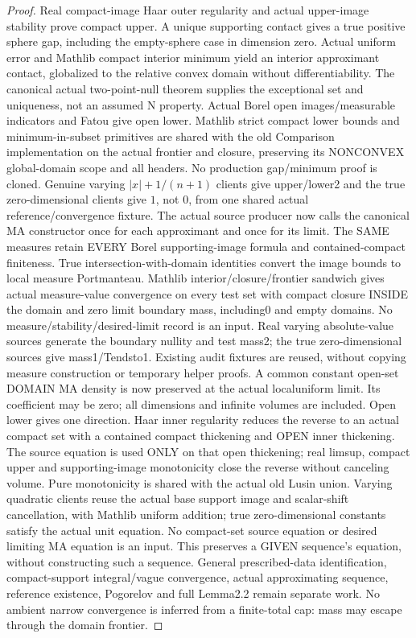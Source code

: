 \begin{proof}
  \leanok
  Real compact-image Haar outer regularity and actual upper-image stability
  prove compact upper. A unique supporting contact gives a true positive
  sphere gap, including the empty-sphere case in dimension zero. Actual
  uniform error and Mathlib compact interior minimum yield an interior
  approximant contact, globalized to the relative convex domain without
  differentiability. The canonical actual two-point-null theorem supplies
  the exceptional set and uniqueness, not an assumed N property. Actual
  Borel open images/measurable indicators and Fatou give open lower.
  Mathlib strict compact lower bounds and minimum-in-subset primitives are
  shared with the old Comparison implementation on the actual frontier
  and closure, preserving its NONCONVEX global-domain scope and all headers.
  No production gap/minimum proof is cloned. Genuine varying $|x|+1/(n+1)$
  clients give upper/lower2 and the true zero-dimensional clients give $1$,
  not $0$, from one shared actual reference/convergence fixture. The actual source producer now calls the canonical MA constructor once
  for each approximant and once for its limit. The SAME measures retain
  EVERY Borel supporting-image formula and contained-compact finiteness.
  True intersection-with-domain identities convert the image bounds to
  local measure Portmanteau. Mathlib interior/closure/frontier sandwich
  gives actual measure-value convergence on every test set with compact
  closure INSIDE the domain and zero limit boundary mass, including0 and
  empty domains. No measure/stability/desired-limit record is an input.
  Real varying absolute-value sources generate the boundary nullity and
  test mass2; the true zero-dimensional sources give mass1/Tendsto1.
  Existing audit fixtures are reused, without copying measure construction
  or temporary helper proofs. A common constant open-set DOMAIN MA
  density is now preserved at the actual localuniform limit. Its coefficient
  may be zero; all dimensions and infinite volumes are included. Open lower
  gives one direction. Haar inner regularity reduces the reverse to an
  actual compact set with a contained compact thickening and OPEN inner
  thickening. The source equation is used ONLY on that open thickening;
  real limsup, compact upper and supporting-image monotonicity close the
  reverse without canceling volume. Pure monotonicity is shared with the
  actual old Lusin union. Varying quadratic clients reuse the actual base
  support image and scalar-shift cancellation, with Mathlib uniform
  addition; true zero-dimensional constants satisfy the actual unit equation.
  No compact-set source equation or desired limiting MA equation is an input.
  This preserves a GIVEN sequence's equation, without constructing such a
  sequence. General prescribed-data identification, compact-support
  integral/vague convergence, actual approximating sequence, reference
  existence, Pogorelov and full Lemma2.2 remain separate work.
  No ambient narrow convergence is inferred from a finite-total cap:
  mass may escape through the domain frontier.
\end{proof}




